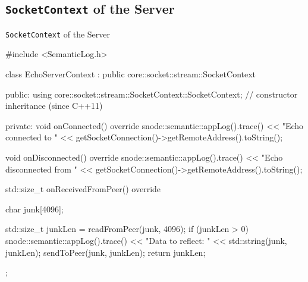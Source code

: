 ﻿\subsection{\texttt{SocketContext} of the Server}

\begin{frame}[fragile]{\texttt{SocketContext} of the Server}
  \begin{cppcode}[autogobble=true, caption={\alert{SocketContext} of the server.},captionpos=b]
    #include <SemanticLog.h>

    class EchoServerContext : public core::socket::stream::SocketContext {
    public:
        using core::socket::stream::SocketContext::SocketContext; // constructor inheritance (since C++11)

    private:
        void onConnected() override {
            snode::semantic::appLog().trace() << "Echo connected to " << getSocketConnection()->getRemoteAddress().toString();
        }

        void onDisconnected() override {
            snode::semantic::appLog().trace() << "Echo disconnected from " << getSocketConnection()->getRemoteAddress().toString();
        }

        std::size_t onReceivedFromPeer() override {
            char junk[4096];

            std::size_t junkLen = readFromPeer(junk, 4096);
            if (junkLen > 0) {
                snode::semantic::appLog().trace() << "Data to reflect: " << std::string(junk, junkLen);
                sendToPeer(junk, junkLen);
            }
            return junkLen;
        }
    };
  \end{cppcode}
\end{frame}
